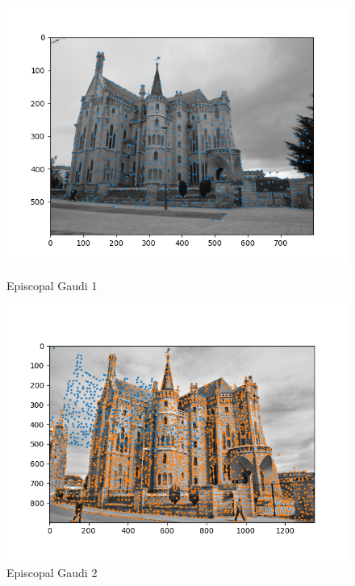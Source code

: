 \begin{figure}[h!]
    \begin{minipage}[b]{0.3\textwidth}
        \includegraphics[width=\textwidth]{imgs/e_gaudi1.png}
        \caption{Episcopal Gaudi 1}
    \end{minipage}
    \begin{minipage}[b]{0.3\textwidth}
        \includegraphics[width=\textwidth]{imgs/e_gaudi2.png}
        \caption{Episcopal Gaudi 2}
    \end{minipage}
    \begin{minipage}[b]{0.3\textwidth}

\end{minipage}
\end{figure}
